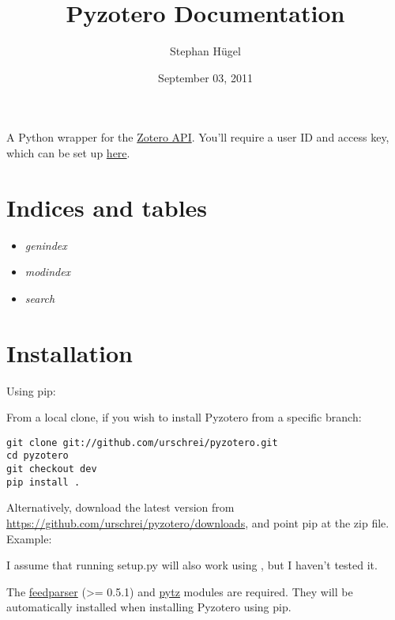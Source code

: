 \documentclass[letterpaper,10pt,english]{sphinxmanual}
\title{Pyzotero Documentation}
\date{September 03, 2011}
\author{Stephan Hügel}
\begin{document}
\maketitle
\tableofcontents
{}\label{index::doc}


A Python wrapper for the \href{http://www.zotero.org/support/dev/server\_api}{Zotero API}. You'll require a user ID and access key, which can be set up \href{http://www.zotero.org/settings/keys/new}{here}.
\label{index:module-pyzotero.zotero}

\chapter{Indices and tables}
\label{index:indices-and-tables}\label{index:description}\begin{itemize}
\item {} 
\emph{genindex}

\item {} 
\emph{modindex}

\item {} 
\emph{search}

\end{itemize}


\chapter{Installation}
\label{index:installation}
Using pip: 

From a local clone, if you wish to install Pyzotero from a specific branch:

\begin{Verbatim}[commandchars=@\[\]]
git clone git://github.com/urschrei/pyzotero.git
cd pyzotero
git checkout dev
pip install .
\end{Verbatim}

Alternatively, download the latest version from \href{https://github.com/urschrei/pyzotero/downloads}{https://github.com/urschrei/pyzotero/downloads}, and point pip at the zip file.
Example: 

I assume that running setup.py will also work using , but I haven't tested it.

The \href{http://feedparser.org}{feedparser} (\textgreater{}= 0.5.1) and \href{http://pypi.python.org/pypi/pytz/}{pytz} modules are required. They will be automatically installed when installing Pyzotero using pip.
\end{document}
